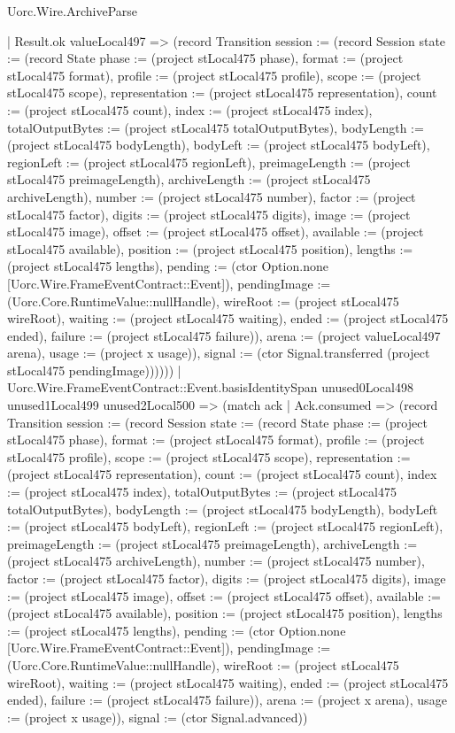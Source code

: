 \begin{lexlean}{Uorc.Wire.ArchiveParse}
\begin{semanticmodule}
{            | Result.ok valueLocal497 => (record Transition {session := (record Session {state := (record State {phase := (project stLocal475 phase), format := (project stLocal475 format), profile := (project stLocal475 profile), scope := (project stLocal475 scope), representation := (project stLocal475 representation), count := (project stLocal475 count), index := (project stLocal475 index), totalOutputBytes := (project stLocal475 totalOutputBytes), bodyLength := (project stLocal475 bodyLength), bodyLeft := (project stLocal475 bodyLeft), regionLeft := (project stLocal475 regionLeft), preimageLength := (project stLocal475 preimageLength), archiveLength := (project stLocal475 archiveLength), number := (project stLocal475 number), factor := (project stLocal475 factor), digits := (project stLocal475 digits), image := (project stLocal475 image), offset := (project stLocal475 offset), available := (project stLocal475 available), position := (project stLocal475 position), lengths := (project stLocal475 lengths), pending := (ctor Option.none [Uorc.Wire.FrameEventContract::Event]), pendingImage := (Uorc.Core.RuntimeValue::nullHandle), wireRoot := (project stLocal475 wireRoot), waiting := (project stLocal475 waiting), ended := (project stLocal475 ended), failure := (project stLocal475 failure)}), arena := (project valueLocal497 arena), usage := (project x usage)}), signal := (ctor Signal.transferred (project stLocal475 pendingImage))}))))
        | Uorc.Wire.FrameEventContract::Event.basisIdentitySpan unused0Local498 unused1Local499 unused2Local500 => (match ack
          | Ack.consumed => (record Transition {session := (record Session {state := (record State {phase := (project stLocal475 phase), format := (project stLocal475 format), profile := (project stLocal475 profile), scope := (project stLocal475 scope), representation := (project stLocal475 representation), count := (project stLocal475 count), index := (project stLocal475 index), totalOutputBytes := (project stLocal475 totalOutputBytes), bodyLength := (project stLocal475 bodyLength), bodyLeft := (project stLocal475 bodyLeft), regionLeft := (project stLocal475 regionLeft), preimageLength := (project stLocal475 preimageLength), archiveLength := (project stLocal475 archiveLength), number := (project stLocal475 number), factor := (project stLocal475 factor), digits := (project stLocal475 digits), image := (project stLocal475 image), offset := (project stLocal475 offset), available := (project stLocal475 available), position := (project stLocal475 position), lengths := (project stLocal475 lengths), pending := (ctor Option.none [Uorc.Wire.FrameEventContract::Event]), pendingImage := (Uorc.Core.RuntimeValue::nullHandle), wireRoot := (project stLocal475 wireRoot), waiting := (project stLocal475 waiting), ended := (project stLocal475 ended), failure := (project stLocal475 failure)}), arena := (project x arena), usage := (project x usage)}), signal := (ctor Signal.advanced)})
}
\end{semanticmodule}
\end{lexlean}
